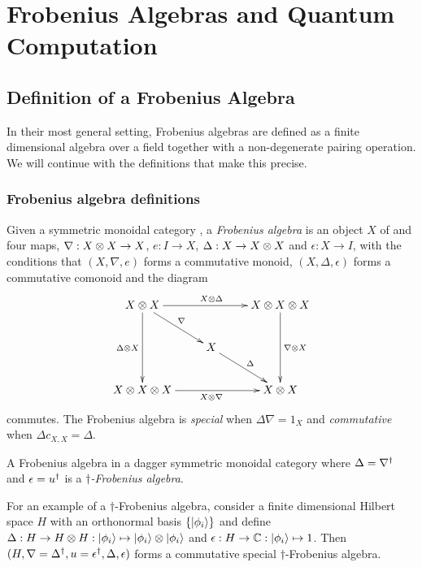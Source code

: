 \chapter{Frobenius Algebras and Quantum Computation} %
\label{cha:frobenius_algebras_and_quantum_computation}
\section{Definition of a Frobenius Algebra} %
\label{sec:definition_of_a_frobenius_algebra}
In their most general setting, Frobenius algebras are defined as a finite dimensional algebra
over a field together with a non-degenerate pairing operation. We will continue with the definitions
that make this precise.

\subsection{Frobenius algebra definitions} %
\label{sub:frobenius_algebra_definitions}


\begin{definition}\label{def:frobeniusalgebra}
  Given a symmetric monoidal category \cD, a \emph{Frobenius algebra} is an object $X$ of \cD and
  four maps, $\nabla :X\otimes X \to X$, $e: I \to X$, $\Delta: X\to X\otimes X$ and $\epsilon:X\to I$, with
  the conditions that $(X,\nabla,e)$ forms a commutative monoid, $(X,\Delta, \epsilon)$ forms a
  commutative comonoid and the diagram
  \[
    \xymatrix{
      X\*X \ar[rr]^{X\*\Delta} \ar[dd]_{\Delta \* X} \ar[dr]^{\nabla}
        && X\*X\*X \ar[dd]^{\nabla\*X}\\
      & X\ar[dr]^{\Delta}\\
      X\*X\*X\ar[rr]_{X\*\nabla}  && X\*X
    }
  \]
  commutes. The Frobenius algebra is \emph{special} when $\Delta \nabla = 1_{X}$ and
  \emph{commutative} when $\Delta c_{X,X} = \Delta$.
\end{definition}
\begin{definition}\label{def:daggerfrob}
  A Frobenius algebra in a dagger symmetric monoidal category where $\Delta = {\nabla}^{\dagger}$ and
  $\epsilon={u}^{\dagger}$ is a $\dagger$\emph{-Frobenius algebra}.
\end{definition}
For an example of a $\dagger$-Frobenius algebra, consider a finite dimensional Hilbert space $H$
with an orthonormal basis $\{\left\vert{\phi_{i}}\right\rangle\}$ and define $\Delta:H\to H\otimes H: \left\vert{\phi_{i}}\right\rangle\mapsto
\left\vert{\phi_{i}}\right\rangle \otimes \left\vert{\phi_{i}}\right\rangle$ and $\epsilon : H\to \mathbb{C} : \left\vert{\phi_{i}}\right\rangle \mapsto 1$. Then $(H,
\nabla={\Delta}^{\dagger}, u={\epsilon}^{\dagger}, \Delta, \epsilon)$ forms a commutative special
$\dagger$-Frobenius algebra.


